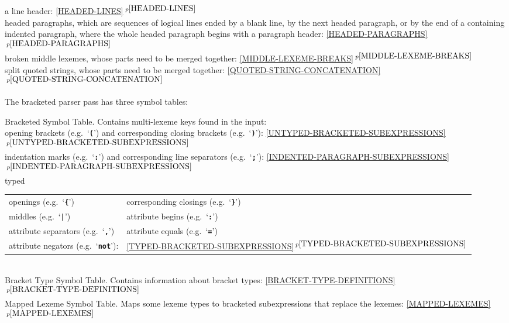 \documentclass[12pt]{article}
\newcommand{\TT}[1]{{\tt \bfseries #1}}
\newcommand{\itemref}[1]{\ref{#1}$\,^{p\pageref{#1}}$}
\newenvironment{indpar}[1][0.3in]%
	{\begin{list}{}%
		     {\setlength{\itemsep}{0in}%
		      \setlength{\topsep}{0in}%
		      \setlength{\parsep}{1ex}%
		      \setlength{\labelwidth}{#1}%
		      \setlength{\leftmargin}{#1}%
		      \addtolength{\leftmargin}{\labelsep}}%
	 \item}%
	{\end{list}}
\begin{document}
\begin{indpar}[0.5in]
    a line header:
    \itemref{HEADED-LINES}
\\[0.5ex]
\hspace*{-0.2in}headed paragraphs,
    which are sequences of logical lines
    ended by a blank line, by the next headed paragraph,
    or by the end of a containing indented paragraph,
    where the whole headed paragraph begins with a paragraph
    header:
    \itemref{HEADED-PARAGRAPHS}
\\[0.5ex]
\hspace*{-0.2in}broken middle lexemes,
    whose parts need to be merged together:
    \itemref{MIDDLE-LEXEME-BREAKS}
\\[0.5ex]
\hspace*{-0.2in}split quoted strings,
    whose parts need to be merged together:
    \itemref{QUOTED-STRING-CONCATENATION}
\end{indpar}

The bracketed parser pass has three symbol tables:
\begin{indpar}[0.3in]
Bracketed Symbol Table.\label{BRACKETED-SYMBOL-TABLE}
Contains multi-lexeme keys found in
the input: \\
\hspace*{0.2in}opening brackets (e.g.~`\TT{(}') and
    corresponding closing brackets (e.g.~`\TT{)}'):
    \itemref{UNTYPED-BRACKETED-SUBEXPRESSIONS}
\\[0.5ex]
\hspace*{0.2in}indentation marks (e.g.~`\TT{:}')
    and corresponding line separators (e.g.~`\TT{;}'):
    \itemref{INDENTED-PARAGRAPH-SUBEXPRESSIONS}
\\[0.5ex]
\hspace*{0.2in}typed
      \begin{tabular}[t]{@{}ll}
      openings (e.g.~`\TT{\{}') &
      corresponding closings (e.g.~`\TT{\}}') \\
      middles (e.g.~`\TT{|}') &
      attribute begins (e.g.~`\TT{:}') \\
      attribute separators (e.g.~`\TT{,}') &
      attribute equals (e.g.~`\TT{=}') \\
      attribute negators (e.g.~`\TT{not}'): &
      \itemref{TYPED-BRACKETED-SUBEXPRESSIONS}
      \end{tabular}
\\[1ex]
Bracket Type Symbol Table. Contains information about bracket types:
\itemref{BRACKET-TYPE-DEFINITIONS}
\\[1ex]
Mapped Lexeme Symbol Table.  Maps some lexeme types to
bracketed subexpressions that replace the lexemes: \itemref{MAPPED-LEXEMES}
\end{indpar}
\end{document}
